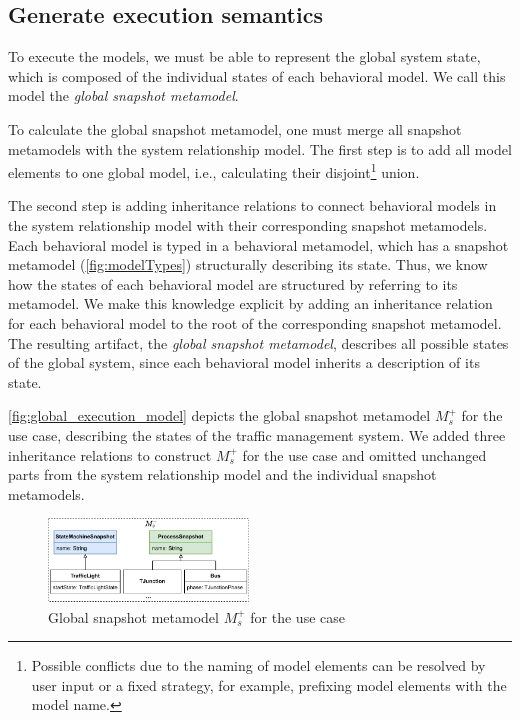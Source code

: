 \documentclass{jot}
\begin{document}
\subsection{Generate execution semantics} \label{subsec:executionSemantics}
To execute the models, we must be able to represent the global system state, which is composed of the individual states of each behavioral model.
We call this model the \emph{global snapshot metamodel}.

To calculate the global snapshot metamodel, one must merge all snapshot metamodels with the system relationship model.
The first step is to add all model elements to one global model, i.e., calculating their disjoint\footnote{Possible conflicts due to the naming of model elements can be resolved by user input or a fixed strategy, for example, prefixing model elements with the model name.} union.

The second step is adding inheritance relations to connect behavioral models in the system relationship model with their corresponding snapshot metamodels.
Each behavioral model is typed in a behavioral metamodel, which has a snapshot metamodel (\autoref{fig:modelTypes}) structurally describing its state.
Thus, we know how the states of each behavioral model are structured by referring to its metamodel.
We make this knowledge explicit by adding an inheritance relation for each behavioral model to the root of the corresponding snapshot metamodel.
The resulting artifact, the \emph{global snapshot metamodel}, describes all possible states of the global system, since each behavioral model inherits a description of its state.

\autoref{fig:global_execution_model} depicts the global snapshot metamodel $M_s^+$ for the use case, describing the states of the traffic management system.
We added three inheritance relations to construct $M_s^+$ for the use case and omitted unchanged parts from the system relationship model and the individual snapshot metamodels.

\begin{figure}[h]
    \centering
    \includegraphics[width=0.475\textwidth]{figures/global_s_model.pdf}
    \caption{Global snapshot metamodel $M_s^+$ for the use case}
    \label{fig:global_execution_model}
\end{figure}
\end{document}
